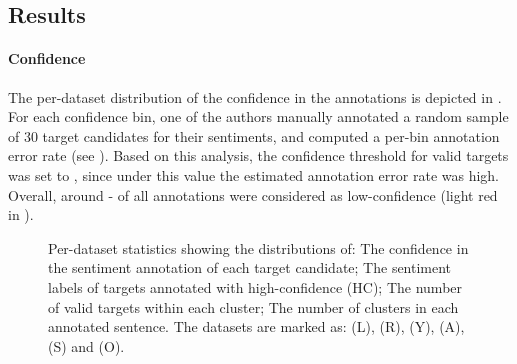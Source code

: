 \subsection{Results}

\paragraph{Confidence} The per-dataset distribution of the confidence in the annotations is depicted in .
For each confidence bin, one of the authors manually annotated a random sample of $30$ target candidates for their sentiments, and computed a per-bin annotation error rate (see ). 
Based on this analysis, the 
confidence threshold for valid targets was set to \minConfidenceThreshold, since under this value the estimated annotation error rate was high. 
Overall, around - of all annotations were considered as low-confidence (light red in ). 

\newcommand{\figureWidth}[0]{0.46}
\newcommand{\topTrim}[0]{0cm}
\begin{figure*}[t]
    \centering
    \qquad
    
    \qquad
    \caption{Per-dataset statistics 
showing the distributions of: \protect{} The confidence in the sentiment annotation of each target candidate;
    \protect{} The sentiment labels of targets annotated with high-confidence (HC); 
    \protect{} The number of valid targets within each cluster;
    \protect{} The number of clusters in each annotated sentence. The datasets are marked as: \SeLapName (L),  \SeResName (R), \YelpName (Y), \AmazonName (A), \SstName (S) and \OpinosisName (O).
    }
     \label{fig:dataset_histograms}
\end{figure*}
 
